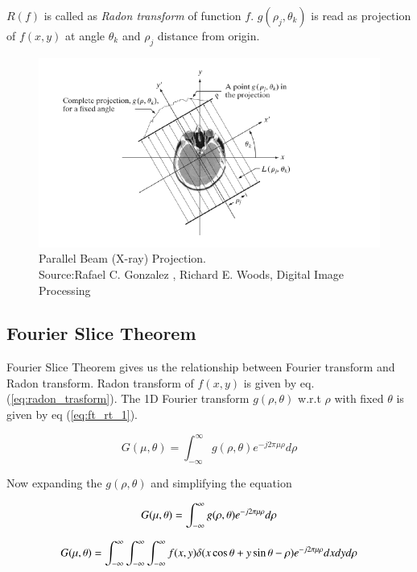 \documentclass[twoside]{iitbreport}
\begin{document}
\noindent
$R(f)$ is called as \textit{Radon transform} of function $f$. $g(\rho_j,\theta_k)$ is read as projection of $f(x,y)$ at angle $\theta_k$ and $\rho_j$ distance from origin.

\begin{figure}[H]
\includegraphics[width=1\textwidth]{parallel_beam}
\centering
\captionsetup{justification=centering}
\caption{ Parallel Beam (X-ray) Projection.\\ Source:Rafael C. Gonzalez , Richard E. Woods, Digital Image Processing}
\label{fig:parallel_beam}
\end{figure}


\subsection{Fourier Slice Theorem} \label{sec:for_slice_theorem}
Fourier Slice Theorem gives us the relationship between Fourier transform and Radon transform. Radon transform of $f(x,y)$ is given by eq. (\ref{eq:radon_trasform}). The 1D Fourier transform $g(\rho,\theta)$ w.r.t $\rho$ with fixed $\theta$ is given by eq (\ref{eq:ft_rt_1}).

\begin{equation}
G(\mu,\theta) = \int_{-\infty}^{\infty} g(\rho,\theta) e^{-j2\pi\mu\rho} d\rho
\label{eq:ft_rt_1}
\end{equation}

Now expanding the $g(\rho,\theta)$  and simplifying the equation

\begin{equation}
G(\mu,\theta) = \int_{-\infty}^{\infty} g(\rho,\theta) e^{-j2\pi\mu\rho} d\rho\\
\end{equation}

\begin{equation}
G(\mu,\theta) = \int_{-\infty}^{\infty} \int_{-\infty}^{\infty} \int_{-\infty}^{\infty} f(x,y)\delta(x\cos\theta+y\sin\theta - \rho)  e^{-j2\pi\mu\rho} dxdyd\rho \\
\end{equation}
\end{document}
